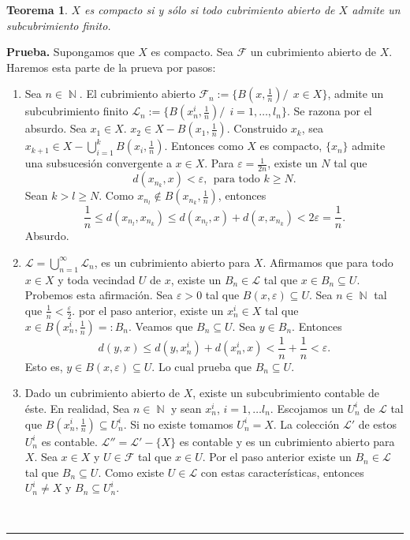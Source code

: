 \documentclass[x11names, 12pt]{book}
\newtheorem{teorema}{Teorema}
\newenvironment{prueba}[1][Prueba]{\noindent\textbf{#1.} }{\ \rule{0.5em}{0.5em}}
\DeclareMathOperator{\ene}{\mathbb{N}}
\begin{document}
\begin{teorema}
$X$ es compacto si y sólo si todo cubrimiento abierto de $X$ admite un subcubrimiento finito.
\end{teorema}
\begin{prueba}
Supongamos que $X$ es compacto. Sea $\mathcal{F}$ un cubrimiento abierto de $X$. Haremos esta parte de la prueva por pasos:
\begin{enumerate}
    \item Sea $n\in \ene.$ El cubrimiento abierto $\mathcal{F}_n:=\{B(x, \frac{1}n)/ \ \ x\in X \}$, admite un subcubrimiento finito \linebreak  $\mathcal{L}_n:=\{B(x^i_n, \frac{1}n)/ \ \ i=1, \dots , l_n  \}$. Se razona por el absurdo. Sea $x_1\in X$. $x_2 \in X-B(x_1,\frac{1}n)$. Construido $x_k$, sea $x_{k+1}\in X-\bigcup_{i=1}^k B(x_i,\frac{1}n)$. Entonces como $X$ es compacto, $\{x_n\}$ admite una subsucesión convergente a $x\in X$. Para $\varepsilon=\frac{1}{2n}$, existe un $N$ tal que
    \[d(x_{n_k},x)<\varepsilon, \ \  \text{para todo $k\geq N$}.\]
    Sean $k>l\geq N$. Como $x_{n_l}\notin B(x_{n_k}, \frac{1}{n})$,  entonces \[\frac{1}{n}\leq d(x_{n_l},x_{n_k}) \leq d(x_{n_l},x)+d(x,x_{n_k}) <2\varepsilon =\frac{1}{n} .\]
    Absurdo.
    \item $\mathcal{L}=\bigcup_{n=1}^\infty \mathcal{L}_n$, es un cubrimiento abierto para $X$. Afirmamos que para todo $x\in X$ y toda vecindad $U$ de $x$, existe un $B_n\in \mathcal{L}$ tal que $x\in B_n\subseteq U .$ Probemos esta afirmación. Sea $\varepsilon > 0$ tal que $ B(x, \varepsilon) \subseteq U$. Sea $n\in \ene$ tal que $\frac{1}{n}<\frac{\varepsilon}{2}.$ por el paso anterior, existe un $x_n^i\in X$ tal que $x\in B(x_n^i , \frac{1}{n})=:B_n.$ Veamos que $B_n\subseteq U.$ Sea $y\in B_n$. Entonces
    \[d(y,x)\leq d(y, x^i_n)+ d( x^i_n, x)<\frac{1}n+\frac{1}n <\varepsilon .\]
    Esto es, $y\in B(x,  \varepsilon) \subseteq U$. Lo cual prueba que $B_n \subseteq U$.
    \item Dado un cubrimiento abierto de $X$, existe un subcubrimiento contable de éste. En realidad, Sea $n\in \ene$ y sean $x_n^i$, $i=1, \dots l_n$. Escojamos un $U_n^i$ de $\mathcal{L}$ tal que $B(x_n^i, \frac{1}n)\subseteq U_n^i$. Si no existe tomamos $U_n^i=X.$ La colección $\mathcal{L}'$ de estos $U_n^i$ es contable.  $\mathcal{L}''=\mathcal{L}'-\{X \}$ es contable y es un cubrimiento abierto para $X$.   Sea $x \in X$ y $U\in\mathcal{F} $ tal que $x \in U$. Por el paso anterior existe un $B_n \in \mathcal{L}$ tal que $B_n\subseteq U$. Como existe $U\in \mathcal{L}$ con estas características, entonces $U_n^i \neq X$ y $B_n \subseteq U_n^i.$

\end{enumerate}
\end{prueba}
\end{document}
